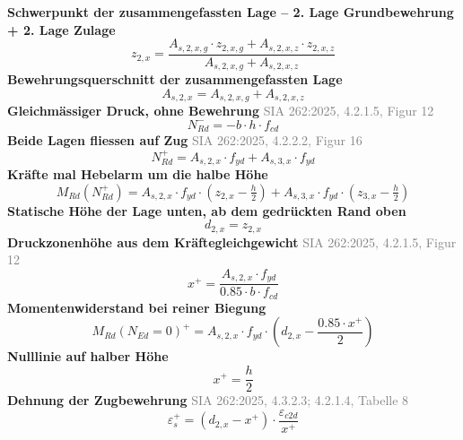 \documentclass[11pt,a4paper]{article}
\newcommand{\normref}[1]{{\small\textcolor{gray}{#1}}}
\begin{document}
\noindent\textbf{Schwerpunkt der zusammengefassten Lage – 2. Lage Grundbewehrung + 2. Lage Zulage}
\begin{equation*}
z_{2,x} = \frac{A_{s,2,x,g} \cdot z_{2,x,g} + A_{s,2,x,z} \cdot z_{2,x,z}}{A_{s,2,x,g} + A_{s,2,x,z}}
\end{equation*}
\noindent\textbf{Bewehrungsquerschnitt der zusammengefassten Lage}
\begin{equation*}
A_{s,2,x} = A_{s,2,x,g} + A_{s,2,x,z}
\end{equation*}
\noindent\textbf{Gleichmässiger Druck, ohne Bewehrung} \hfill \normref{SIA 262:2025, 4.2.1.5, Figur 12}
\begin{equation*}
N_{Rd}^{-} = -b \cdot h \cdot f_{cd}
\end{equation*}
\noindent\textbf{Beide Lagen fliessen auf Zug} \hfill \normref{SIA 262:2025, 4.2.2.2, Figur 16}
\begin{equation*}
N_{Rd}^{+} = A_{s,2,x} \cdot f_{yd} + A_{s,3,x} \cdot f_{yd}
\end{equation*}
\noindent\textbf{Kräfte mal Hebelarm um die halbe Höhe}
\begin{equation*}
M_{Rd}(N_{Rd}^{+}) = A_{s,2,x} \cdot f_{yd} \cdot \left(z_{2,x} - \tfrac{h}{2}\right) + A_{s,3,x} \cdot f_{yd} \cdot \left(z_{3,x} - \tfrac{h}{2}\right)
\end{equation*}
\noindent\textbf{Statische Höhe der Lage unten, ab dem gedrückten Rand oben}
\begin{equation*}
d_{2,x} = z_{2,x}
\end{equation*}
\noindent\textbf{Druckzonenhöhe aus dem Kräftegleichgewicht} \hfill \normref{SIA 262:2025, 4.2.1.5, Figur 12}
\begin{equation*}
x^{+} = \frac{A_{s,2,x} \cdot f_{yd}}{0.85 \cdot b \cdot f_{cd}}
\end{equation*}
\noindent\textbf{Momentenwiderstand bei reiner Biegung}
\begin{equation*}
M_{Rd}(N_{Ed}=0)^{+} = A_{s,2,x} \cdot f_{yd} \cdot \left(d_{2,x} - \frac{0.85 \cdot x^{+}}{2}\right)
\end{equation*}
\noindent\textbf{Nulllinie auf halber Höhe}
\begin{equation*}
x^{+} = \frac{h}{2}
\end{equation*}
\noindent\textbf{Dehnung der Zugbewehrung} \hfill \normref{SIA 262:2025, 4.3.2.3; 4.2.1.4, Tabelle 8}
\begin{equation*}
\varepsilon_s^{+} = \left(d_{2,x} - x^{+}\right) \cdot \frac{\varepsilon_{c2d}}{x^{+}}
\end{equation*}
\end{document}
